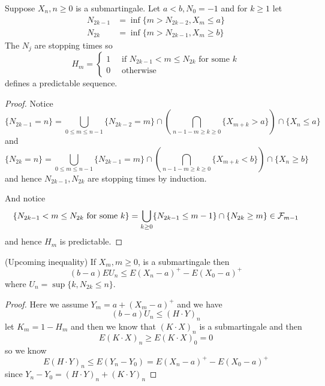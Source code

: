 \begin{definition}
    Suppose $X_n, n\geq 0$ is a submartingale. Let $a<b, N_0 = -1$ and for $k\geq 1$ let
    \[
    \begin{aligned}
        N_{2k-1} &= \inf\{m>N_{2k-2},X_m\leq a\} \\
        N_{2k} &= \inf\{m>N_{2k-1}, X_m \geq b\}
    \end{aligned}
    \] 
    The $N_j$ are stopping times so
    \[
    H_m = \begin{cases}
        1\quad\text{ if }N_{2k-1}<m\leq N_{2k}\text{ for some }k\\
        0\quad\text{ otherwise}
    \end{cases}
    \]
    defines a predictable sequence.
\end{definition}
\begin{proof}\par
    Notice
    \[\{N_{2k-1} = n\} = \bigcup_{0\leq m \leq n-1}\{N_{2k-2} = m\}\cap(\bigcap_{ n-1-m\geq k\geq 0}\{X_{m+k} > a\})\cap\{X_n \leq a\}\]
    and
    \[
    \{N_{2k} = n\} = \bigcup_{0\leq m \leq n-1}\{N_{2k-1} = m\}\cap(\bigcap_{ n-1-m\geq k\geq 0}\{X_{m+k} < b\})\cap\{X_n \geq b\}
    \]
    and hence $N_{2k-1},N_{2k}$ are stopping times by induction.\par
    And notice
    \[
    \{N_{2k-1}<m\leq N_{2k}\text{ for some }k\} = \bigcup_{k\geq 0} \{N_{2k-1} \leq m-1\}\cap\{N_{2k}\geq m\} \in \mathcal{F}_{m-1}
    \]
    and hence $H_m$ is predictable.
\end{proof}

\begin{theorem}
    (Upcoming inequality) If $X_m,m\geq 0$, is a submartingale then
    \[(b-a)EU_n \leq E(X_n-a)^+ - E(X_0-a)^+\]
    where $U_n = \sup\{k, N_{2k} \leq n\}$.
\end{theorem}
\begin{proof}\par
    Here we assume $Y_m = a+(X_m-a)^+$ and we have
    \[
    (b-a)U_n \leq (H\cdot Y)_n
    \]
    let $K_m = 1-H_m$ and then we know that $(K\cdot X)_n$ is a submartingale and then
    \[E(K\cdot X)_n \geq E(K\cdot X)_0 = 0\]
    so we know
    \[E(H\cdot Y)_n \leq E(Y_n-Y_0) = E(X_n-a)^+ - E(X_0-a)^+\]
    since $Y_n-Y_0 = (H\cdot Y)_n + (K\cdot Y)_n$
\end{proof}

